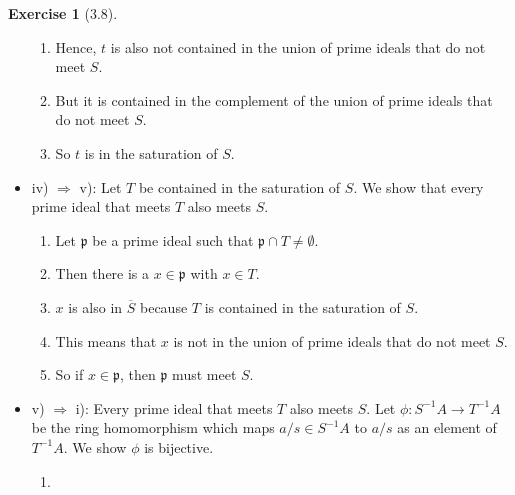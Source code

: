 \documentclass{book}
\theoremstyle{plain}
\theoremstyle{definition}
\newtheorem{exercise}[theorem]{Exercise}
\theoremstyle{custom_definition}
\begin{document}
\begin{exercise}[3.8]
\begin{itemize}
\begin{enumerate}
            \item Hence, \(t\) is also not contained in the union of prime ideals that do not meet \(S\).
            \item But it is contained in the complement of the union of prime ideals that do not meet \(S\).
            \item So \(t\) is in the saturation of \(S\).
        \end{enumerate}
        \item iv) \(\Rightarrow\) v): Let \(T\) be contained in the saturation of \(S\). We show that every prime ideal that meets \(T\) also meets \(S\).
        \begin{enumerate}
            \item Let \(\mathfrak{p}\) be a prime ideal such that \(\mathfrak{p} \cap T \neq \emptyset\).
            \item Then there is a \(x \in \mathfrak{p}\) with \(x \in T\).
            \item \(x\) is also in \(\overline{S}\) because \(T\) is contained in the saturation of \(S\).
            \item This means that \(x\) is not in the union of prime ideals that do not meet \(S\).
            \item So if \(x \in \mathfrak{p}\), then \(\mathfrak{p}\) must meet \(S\).
        \end{enumerate}
        \item v) \(\Rightarrow\) i): Every prime ideal that meets \(T\) also meets \(S\). Let \(\phi: S^{-1}A \longrightarrow T^{-1}A\) be the ring homomorphism which maps \(a/s \in S^{-1}A\) to \(a/s\) as an element of \(T^{-1}A\). We show \(\phi\) is bijective.
        \begin{enumerate}
            \item 
        \end{enumerate}
    \end{itemize}
\end{exercise}
\end{document}
